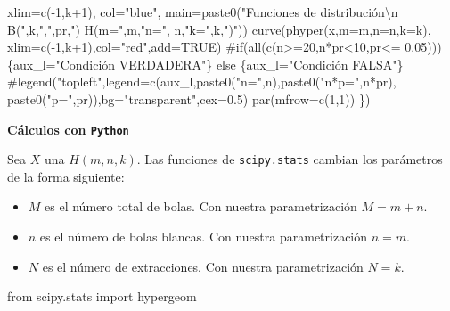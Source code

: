 \documentclass[
  letterpaper,
  DIV=11,
  numbers=noendperiod]{scrreprt}
\newenvironment{Shaded}{\begin{snugshade}}{\end{snugshade}}
\newcommand{\AttributeTok}[1]{\textcolor[rgb]{0.40,0.45,0.13}{#1}}
\newcommand{\CommentTok}[1]{\textcolor[rgb]{0.37,0.37,0.37}{#1}}
\newcommand{\ConstantTok}[1]{\textcolor[rgb]{0.56,0.35,0.01}{#1}}
\newcommand{\ControlFlowTok}[1]{\textcolor[rgb]{0.00,0.23,0.31}{#1}}
\newcommand{\DecValTok}[1]{\textcolor[rgb]{0.68,0.00,0.00}{#1}}
\newcommand{\ErrorTok}[1]{\textcolor[rgb]{0.68,0.00,0.00}{#1}}
\newcommand{\FloatTok}[1]{\textcolor[rgb]{0.68,0.00,0.00}{#1}}
\newcommand{\FunctionTok}[1]{\textcolor[rgb]{0.28,0.35,0.67}{#1}}
\newcommand{\ImportTok}[1]{\textcolor[rgb]{0.00,0.46,0.62}{#1}}
\newcommand{\NormalTok}[1]{\textcolor[rgb]{0.00,0.23,0.31}{#1}}
\newcommand{\OtherTok}[1]{\textcolor[rgb]{0.00,0.23,0.31}{#1}}
\newcommand{\SpecialCharTok}[1]{\textcolor[rgb]{0.37,0.37,0.37}{#1}}
\newcommand{\StringTok}[1]{\textcolor[rgb]{0.13,0.47,0.30}{#1}}
\providecommand{\tightlist}{%
  \setlength{\itemsep}{0pt}\setlength{\parskip}{0pt}}\usepackage{longtable,booktabs,array}
\begin{document}
\begin{Shaded}
\begin{Highlighting}[]
        \AttributeTok{xlim=}\FunctionTok{c}\NormalTok{(}\SpecialCharTok{{-}}\DecValTok{1}\NormalTok{,k}\SpecialCharTok{+}\DecValTok{1}\NormalTok{), }\AttributeTok{col=}\StringTok{"blue"}\NormalTok{, }
         \AttributeTok{main=}\FunctionTok{paste0}\NormalTok{(}\StringTok{"Funciones de distribución}\SpecialCharTok{\textbackslash{}n}\StringTok{ B("}\NormalTok{,k,}\StringTok{","}\NormalTok{,pr,}\StringTok{") }
\StringTok{                     H(m="}\NormalTok{,m,}\StringTok{"n="}\NormalTok{, n,}\StringTok{"k="}\NormalTok{,k,}\StringTok{")"}\NormalTok{))}
  \FunctionTok{curve}\NormalTok{(}\FunctionTok{phyper}\NormalTok{(x,}\AttributeTok{m=}\NormalTok{m,}\AttributeTok{n=}\NormalTok{n,}\AttributeTok{k=}\NormalTok{k),}
        \AttributeTok{xlim=}\FunctionTok{c}\NormalTok{(}\SpecialCharTok{{-}}\DecValTok{1}\NormalTok{,k}\SpecialCharTok{+}\DecValTok{1}\NormalTok{),}\AttributeTok{col=}\StringTok{"red"}\NormalTok{,}\AttributeTok{add=}\ConstantTok{TRUE}\NormalTok{)}
  \CommentTok{\#if(all(c(n\textgreater{}=20,n*pr\textless{}10,pr\textless{}= 0.05)))\{aux\_l="Condición VERDADERA"\} }
  \ControlFlowTok{else}\NormalTok{ \{aux\_l}\OtherTok{=}\StringTok{"Condición FALSA"}\NormalTok{\}}
  \CommentTok{\#legend("topleft",legend=c(aux\_l,paste0("n=",n),paste0("n*p=",n*pr),}
  \FunctionTok{paste0}\NormalTok{(}\StringTok{"p="}\NormalTok{,pr)}\ErrorTok{)}\NormalTok{,bg}\OtherTok{=}\StringTok{"transparent"}\NormalTok{,cex}\OtherTok{=}\FloatTok{0.5}\ErrorTok{)}
  \FunctionTok{par}\NormalTok{(}\AttributeTok{mfrow=}\FunctionTok{c}\NormalTok{(}\DecValTok{1}\NormalTok{,}\DecValTok{1}\NormalTok{))}
\NormalTok{\})}
\end{Highlighting}
\end{Shaded}

\textbf{Cálculos con \texttt{Python}}

Sea \(X\) una \(H(m,n,k)\). Las funciones de \texttt{scipy.stats}
cambian los parámetros de la forma siguiente:

\begin{itemize}
\tightlist
\item
  \(M\) es el número total de bolas. Con nuestra parametrización
  \(M=m+n\).
\item
  \(n\) es el número de bolas blancas. Con nuestra parametrización
  \(n=m\).
\item
  \(N\) es el número de extracciones. Con nuestra parametrización
  \(N=k\).
\end{itemize}

\begin{Shaded}
\begin{Highlighting}[]
\ImportTok{from}\NormalTok{ scipy.stats }\ImportTok{import}\NormalTok{ hypergeom}
\end{Highlighting}
\end{Shaded}
\end{document}
